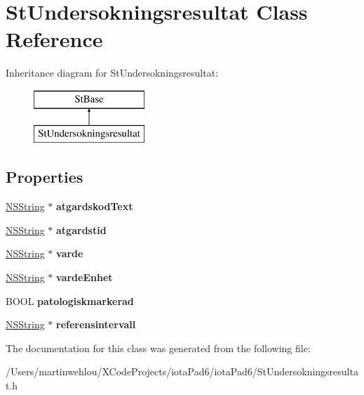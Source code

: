 \hypertarget{interface_st_undersokningsresultat}{
\section{StUndersokningsresultat Class Reference}
\label{interface_st_undersokningsresultat}
}
Inheritance diagram for StUndersokningsresultat:\begin{figure}[H]
\begin{center}
\leavevmode
\includegraphics[height=2.000000cm]{interface_st_undersokningsresultat}
\end{center}
\end{figure}
\subsection*{Properties}
\begin{DoxyCompactItemize}
\item 
\hypertarget{interface_st_undersokningsresultat_a2c11b9615e2c1f8a54132dda0441e5f8}{
\hyperlink{class_n_s_string}{NSString} $\ast$ {\bfseries atgardskodText}}
\label{interface_st_undersokningsresultat_a2c11b9615e2c1f8a54132dda0441e5f8}

\item 
\hypertarget{interface_st_undersokningsresultat_af4cf746c8a760ea1ad69cd68fe244d4c}{
\hyperlink{class_n_s_string}{NSString} $\ast$ {\bfseries atgardstid}}
\label{interface_st_undersokningsresultat_af4cf746c8a760ea1ad69cd68fe244d4c}

\item 
\hypertarget{interface_st_undersokningsresultat_a0373fc95c47b2a8566b007e652e2a39d}{
\hyperlink{class_n_s_string}{NSString} $\ast$ {\bfseries varde}}
\label{interface_st_undersokningsresultat_a0373fc95c47b2a8566b007e652e2a39d}

\item 
\hypertarget{interface_st_undersokningsresultat_ab76c5f2a453c0686fc315a8e20c2b370}{
\hyperlink{class_n_s_string}{NSString} $\ast$ {\bfseries vardeEnhet}}
\label{interface_st_undersokningsresultat_ab76c5f2a453c0686fc315a8e20c2b370}

\item 
\hypertarget{interface_st_undersokningsresultat_aca7ca467d097289aa5c8369ebf0fc3dc}{
BOOL {\bfseries patologiskmarkerad}}
\label{interface_st_undersokningsresultat_aca7ca467d097289aa5c8369ebf0fc3dc}

\item 
\hypertarget{interface_st_undersokningsresultat_af3be0312257dd358e79160a48b642afb}{
\hyperlink{class_n_s_string}{NSString} $\ast$ {\bfseries referensintervall}}
\label{interface_st_undersokningsresultat_af3be0312257dd358e79160a48b642afb}

\end{DoxyCompactItemize}


The documentation for this class was generated from the following file:\begin{DoxyCompactItemize}
\item 
/Users/martinwehlou/XCodeProjects/iotaPad6/iotaPad6/StUndersokningsresultat.h\end{DoxyCompactItemize}
